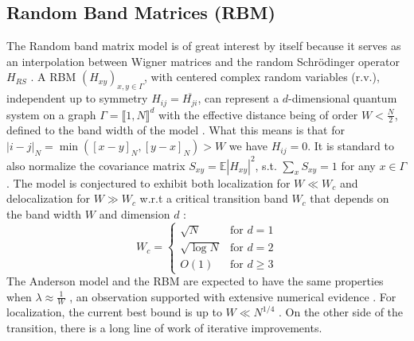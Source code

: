 \documentclass[11pt]{article}
\begin{document}
\subsection*{Random Band Matrices (RBM)}
The Random band matrix model is of great interest by itself because it serves as an interpolation between Wigner matrices and the random Schrödinger operator $H_{RS}$ \cite{dynamic}. A RBM $(H_{xy})_{x, y\in \Gamma}$, with centered complex random variables (r.v.), independent up to symmetry $H_{ij} = \overline{H_{ji}}$, can represent a $d$-dimensional quantum system on a graph $\Gamma = \llbracket 1, N\rrbracket ^d$ with the effective distance being of order $W<\frac{N}{2}$, defined to the band width of the model \cite{7, 21}.  What this means is that for $|i-j|_{N} = \min\left([x-y]_N, [y-x]_N\right)>W$ we have $H_{ij}=0$. It is standard to also normalize the covariance matrix $S_{xy} = \mathbb{E} |H_{xy}|^2$, s.t. $\sum_x S_{xy}=1$ for any $x\in \Gamma$. The model is conjectured to exhibit both localization for $W\ll W_c$ and delocalization for $W\gg W_c$ w.r.t a critical transition band $W_c$ that depends on the band width $W$ and dimension $d$ \cite{7}:  \[
W_c = 
\begin{cases} 
\sqrt{N} & \text{for } d=1 \\ 
\sqrt{\log N} & \text{for } d=2 \\
O(1) & \text{for } d\geq 3

\end{cases}
\]
The Anderson model and the RBM are expected to have the same properties when $\lambda  \approx \frac{1}{W}$ \cite{7}, an observation supported with extensive numerical evidence \cite{arbm1, arbm2}. For localization, the current best bound is up to $W\ll N^{1/4}$ \cite{13}. On the other side of the transition, there is a long line of work of iterative improvements.\vspace{0.255 cm}
\end{document}
